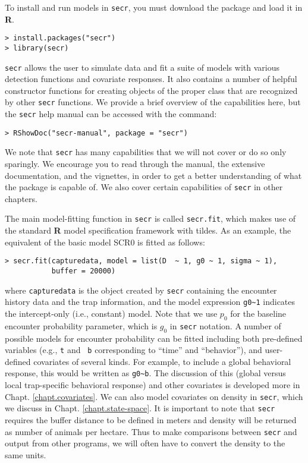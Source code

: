 To install
and run models in \mbox{\tt secr}, you must download the package and
load it in
{\bf R}.
\begin{verbatim}
> install.packages("secr")
> library(secr)
\end{verbatim}
\mbox{\tt secr} allows the user to simulate data and fit a suite of models with
various detection functions and covariate responses. It also contains
a number of helpful constructor functions for creating objects of the
proper class that are recognized by other \mbox{\tt secr}
functions. We provide a brief overview of the capabilities here, but
the \mbox{\tt secr} help manual can be accessed with the command:
\begin{verbatim}
> RShowDoc("secr-manual", package = "secr")
\end{verbatim}
We note that \mbox{\tt secr} has many capabilities that we will not
cover or do so only sparingly. We encourage you to read through the
manual, the extensive documentation, and the vignettes, in order
to get a better understanding of what the package is capable of. We
also cover certain capabilities of \mbox{\tt secr} in other
chapters. 

The main model-fitting function in   \mbox{\tt secr} is called
\mbox{\tt secr.fit}, which 
makes use of the
standard {\bf R} model specification framework with tildes. 
As an example, the equivalent of the
basic model SCR0  is fitted as follows: 
{\small
\begin{verbatim}
> secr.fit(capturedata, model = list(D  ~ 1, g0 ~ 1, sigma ~ 1), 
           buffer = 20000)
\end{verbatim}
}
{\flushleft where} \mbox{\tt capturedata} is the  object created by \mbox{\tt secr}
containing the encounter history data and the trap information, and
the model expression \verb#g0~1# indicates the intercept-only (i.e.,
constant) model.  Note that we use $p_{0}$ for the baseline encounter
probability parameter, which is $g_{0}$ in \mbox{\tt secr} notation.
A number of possible models for encounter probability can be fitted
including both pre-defined variables (e.g., \mbox{\tt t} and \mbox{\tt
  b} corresponding to ``time'' and ``behavior''), and user-defined
covariates of several kinds.  For example, to include a global
behavioral response, this would be written as \verb#g0~b#.  The
discussion of this (global versus local trap-specific behavioral
response) and other covariates is developed more in
Chapt. \ref{chapt.covariates}.  We can also model covariates on
density in \mbox{\tt secr}, which we discuss in Chapt. \ref{chapt.state-space}.
It is important to note that \mbox{\tt secr} requires the buffer distance to be
defined in meters and density will be returned as number of animals
per hectare.  Thus to make comparisons between \mbox{\tt secr} and
output from other programs, 
we will often have to convert the density to the same units.



